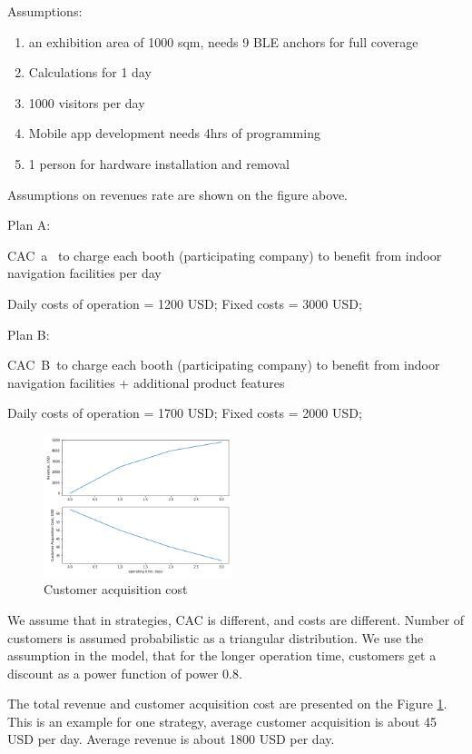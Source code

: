 Assumptions:

\begin{enumerate}
	\item     an exhibition area of 1000 sqm, needs 9 BLE anchors for full coverage
	\item     Calculations for 1 day
	\item     1000 visitors per day
	\item     Mobile app development needs 4hrs of programming
	\item     1 person for hardware installation and removal
\end{enumerate}

Assumptions on revenues rate are shown on the figure above.

Plan A:

CAC~a~ to charge each booth (participating company) to benefit from indoor navigation facilities per day

Daily costs of operation = 1200 USD; Fixed costs = 3000 USD;

Plan B:

CAC~B~to charge each booth (participating company) to benefit from indoor navigation facilities + additional product features

Daily costs of operation = 1700 USD; Fixed costs = 2000 USD;

\begin{figure}
	\includegraphics[width=0.49\textwidth]{graphics/roadmap/fin/varg_10runs.png}
	\caption{Customer acquisition cost}
	\label{fig:cac}
\end{figure}

We assume that in strategies, CAC is different, and costs are different. Number of customers is assumed probabilistic as a triangular distribution. We use the assumption in the model, that for the longer operation time, customers get a discount as a power function of power 0.8.

The total revenue and customer acquisition cost are presented on the Figure \ref{fig:cac}. This is an example for one strategy, average customer acquisition is about 45 USD per day. Average revenue is about 1800 USD per day.

